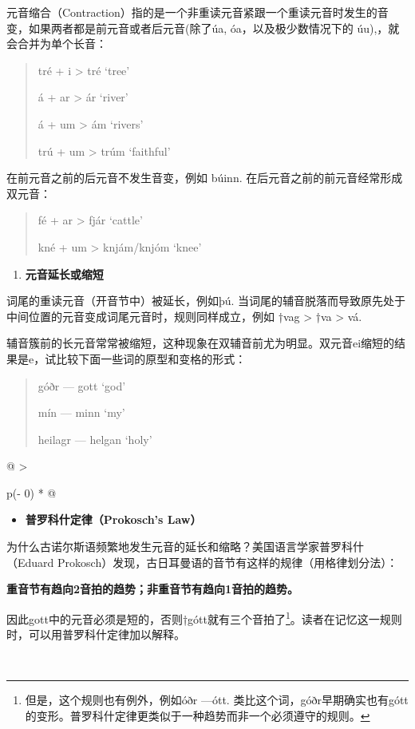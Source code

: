 元音缩合（Contraction）指的是一个非重读元音紧跟一个重读元音时发生的音变，如果两者都是前元音或者后元音(除了úa,
óa，以及极少数情况下的 úu),，就会合并为单个长音：

\begin{quote}
  tré + i \textgreater{} tré `tree'

  á + ar \textgreater{} ár `river'

  á + um \textgreater{} ám `rivers'

  trú + um \textgreater{} trúm `faithful'
\end{quote}

在前元音之前的后元音不发生音变，例如 búinn.
在后元音之前的前元音经常形成双元音：

\begin{quote}
  fé + ar \textgreater{} fjár `cattle'

  kné + um \textgreater{} knjám/knjóm `knee'
\end{quote}

\begin{enumerate}
  \def\labelenumi{\Alph{enumi}.}
  \setcounter{enumi}{2}
  \item
        \textbf{元音延长或缩短}
\end{enumerate}

词尾的重读元音（开音节中）被延长，例如þú.
当词尾的辅音脱落而导致原先处于中间位置的元音变成词尾元音时，规则同样成立，例如
†vag \textgreater{} †va \textgreater{} vá.

辅音簇前的长元音常常被缩短，这种现象在双辅音前尤为明显。双元音ei缩短的结果是e，试比较下面一些词的原型和变格的形式：

\begin{quote}
  góðr --- gott `god'

  mín --- minn `my'

  heilagr --- helgan `holy'
\end{quote}

\begin{longtable}[]{@{}
  >{\raggedright\arraybackslash}p{(\columnwidth - 0\tabcolsep) * }@{}}
  \toprule\noalign{}
  \begin{minipage}[b]{\linewidth}\raggedright
    \begin{itemize}
      \item
            \textbf{普罗科什定律（Prokosch's Law）}
    \end{itemize}

    为什么古诺尔斯语频繁地发生元音的延长和缩略？美国语言学家普罗科什（Eduard
    Prokosch）发现，古日耳曼语的音节有这样的规律（用格律划分法）：

    \textbf{重音节有趋向2音拍的趋势；非重音节有趋向1音拍的趋势。}

    因此gott中的元音必须是短的，否则†gótt就有三个音拍了\footnote{但是，这个规则也有例外，例如óðr
      ---ótt.
      类比这个词，góðr早期确实也有gótt的变形。普罗科什定律更类似于一种趋势而非一个必须遵守的规则。}。读者在记忆这一规则时，可以用普罗科什定律加以解释。
  \end{minipage} \\
  \midrule\noalign{}
  \endhead
  \bottomrule\noalign{}
  \endlastfoot
\end{longtable}

